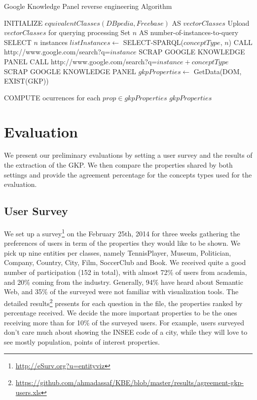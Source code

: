 \documentclass[runningheads,a4paper]{llncs}
\begin{document}
\begin{algorithm}[h]
\caption{Google Knowledge Panel reverse engineering Algorithm} \label{algoscrapping}
\begin{algorithmic}[1]
    \STATE INITIALIZE $equivalentClasses(DBpedia,Freebase) $ AS $vectorClasses$
    \STATE Upload $vectorClasses$ for querying processing
    \STATE Set $n$ AS number-of-instances-to-query
	\STATE SELECT $n$ instances
	\STATE $listInstances \leftarrow$ SELECT-SPARQL($conceptType$, $n$)
			\STATE CALL http://www.google.com/search?q=$instance$
				\STATE SCRAP GOOGLE KNOWLEDGE PANEL
			\ELSE
				\STATE CALL http://www.google.com/search?q=$instance + conceptType$
 				\STATE SCRAP GOOGLE KNOWLEDGE PANEL
			\ENDIF
			\STATE $gkpProperties \leftarrow$ GetData(DOM, EXIST(GKP))
			
		\ENDFOR
	\STATE COMPUTE ocurrences for each $prop \in gkpProperties$
    \ENDFOR
    \RETURN $gkpProperties$
\end{algorithmic}
\end{algorithm}


\section{Evaluation}
\label{sec:evaluation}
We present our preliminary evaluations by setting a user survey and the results of the extraction of the GKP. We then compare the properties shared by both settings and provide the agreement percentage for the concepts types used for the evaluation.

\subsection{User Survey}
\label{sec:survey}
We set up a survey\footnote{\url{http://eSurv.org?u=entityviz}} on the February 25th, 2014 for three weeks gathering the preferences of users in term of the properties they would like to be shown. We pick up nine entities per classes, namely \textsf{TennisPlayer}, \textsf{Museum}, \textsf{Politician}, \textsf{Company}, \textsf{Country}, \textsf{City}, \textsf{Film}, \textsf{SoccerClub} and \textsf{Book}.
We received quite a good number of participation (152 in total), with almost 72\% of users from academia, and 20\% coming from the industry. Generally, 94\% have heard about Semantic Web, and 35\% of the surveyed were not familiar with visualization tools. The detailed results\footnote{\url{https://github.com/ahmadassaf/KBE/blob/master/results/agreement-gkp-users.xls}} presents for each question in the file, the properties ranked by percentage received. We decide the more important properties to be the ones receiving more than for 10\% of the surveyed users.
 For example, users surveyed don't care much about showing the \textsf{INSEE code} of a city, while they will love to see mostly \textsf{population}, \textsf{points of interest} properties.
\end{document}
